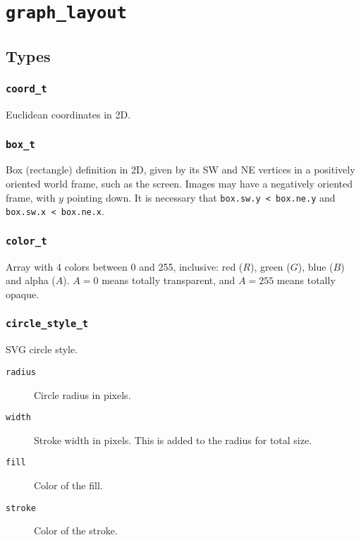 \section{\texttt{graph\_layout}}

\subsection{Types}

\subsubsection{\texttt{coord\_t}}

Euclidean coordinates in 2D.

\subsubsection{\texttt{box\_t}}

Box (rectangle) definition in 2D, given by its SW and NE vertices in a 
positively oriented world frame, such as the screen. Images may have
a negatively oriented frame, with $y$ pointing down.
It is necessary that \texttt{box.sw.y < box.ne.y} and \texttt{box.sw.x < box.ne.x}.

\subsubsection{\texttt{color\_t}}

Array with 4 colors between 0 and 255, inclusive: red ($R$), green ($G$), blue ($B$) and 
alpha ($A$). $A=0$ means totally transparent, and $A = 255$ means totally opaque.

\subsubsection{\texttt{circle\_style\_t}}

SVG circle style.

\begin{description}
 \item[\texttt{radius}] Circle radius in pixels.
 \item[\texttt{width}] Stroke width in pixels. This is added to the radius for total
 size.
 \item[\texttt{fill}] Color of the fill.
 \item[\texttt{stroke}] Color of the stroke.
\end{description}

